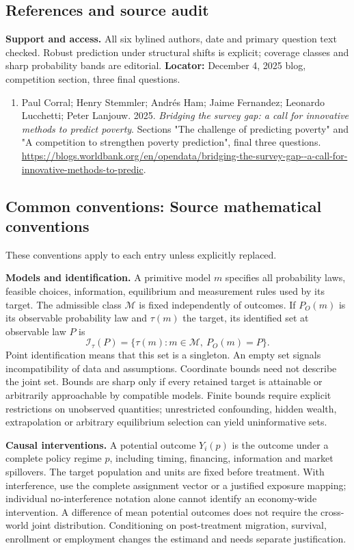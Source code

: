 \documentclass[11pt,a4paper]{article}
\begin{document}
\subsection*{References and source audit}
\textbf{Support and access.} All six bylined authors, date and primary question text checked. Robust prediction under structural shifts is explicit; coverage classes and sharp probability bands are editorial. \textbf{Locator:} December 4, 2025 blog, competition section, three final questions.
\begin{enumerate}\raggedright
\item\hypertarget{definitions:source:30007661:1}{} Paul Corral; Henry Stemmler; Andrés Ham; Jaime Fernandez; Leonardo Lucchetti; Peter Lanjouw. 2025. \emph{Bridging the survey gap: a call for innovative methods to predict poverty}. Sections "The challenge of predicting poverty" and "A competition to strengthen poverty prediction", final three questions.
\url{https://blogs.worldbank.org/en/opendata/bridging-the-survey-gap--a-call-for-innovative-methods-to-predic}.
\end{enumerate}

\subsection*{Common conventions: Source mathematical conventions}

These conventions apply to each entry unless explicitly replaced.

\textbf{Models and identification.} A primitive model \(m\) specifies all probability laws, feasible choices, information, equilibrium and measurement rules used by its target. The admissible class \(\mathcal M\) is fixed independently of outcomes. If \(P_O(m)\) is its observable probability law and \(\tau(m)\) the target, its identified set at observable law \(P\) is
\[
 \mathcal I_\tau(P)=\{\tau(m):m\in\mathcal M,\ P_O(m)=P\}.
\]
Point identification means that this set is a singleton. An empty set signals incompatibility of data and assumptions. Coordinate bounds need not describe the joint set. Bounds are sharp only if every retained target is attainable or arbitrarily approachable by compatible models. Finite bounds require explicit restrictions on unobserved quantities; unrestricted confounding, hidden wealth, extrapolation or arbitrary equilibrium selection can yield uninformative sets.

\textbf{Causal interventions.} A potential outcome \(Y_i(p)\) is the outcome under a complete policy regime \(p\), including timing, financing, information and market spillovers. The target population and units are fixed before treatment. With interference, use the complete assignment vector or a justified exposure mapping; individual no-interference notation alone cannot identify an economy-wide intervention. A difference of mean potential outcomes does not require the cross-world joint distribution. Conditioning on post-treatment migration, survival, enrollment or employment changes the estimand and needs separate justification.
\end{document}
